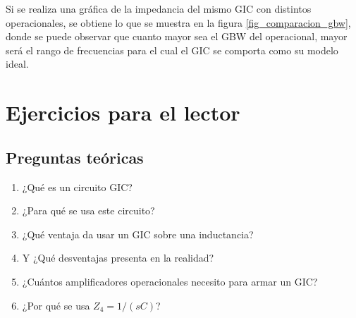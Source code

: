 Si se realiza una gráfica de la impedancia del mismo GIC con distintos operacionales, se obtiene lo que se muestra en la figura \ref{fig_comparacion_gbw}, donde se puede observar que cuanto mayor sea el GBW del operacional, mayor será el rango de frecuencias para el cual el GIC se comporta como su modelo ideal.

\section{Ejercicios para el lector}

\subsection{Preguntas teóricas}

\begin{enumerate}
  \item ¿Qué es un circuito GIC?
  \item ¿Para qué se usa este circuito?
  \item ¿Qué ventaja da usar un GIC sobre una inductancia?
  \item Y ¿Qué desventajas presenta en la realidad?
  \item ¿Cuántos amplificadores operacionales necesito para armar un GIC?
  \item ¿Por qué se usa \(Z_4=1/(sC)\)?
\end{enumerate}
